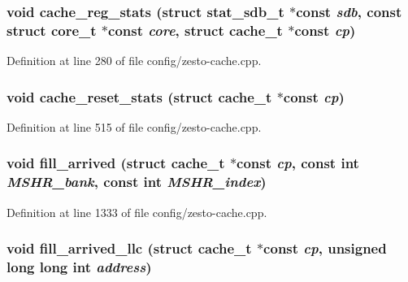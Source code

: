 \subsubsection[{cache\_\-reg\_\-stats}]{\setlength{\rightskip}{0pt plus 5cm}void cache\_\-reg\_\-stats (struct {\bf stat\_\-sdb\_\-t} $\ast$const  {\em sdb}, \/  const struct {\bf core\_\-t} $\ast$const  {\em core}, \/  struct {\bf cache\_\-t} $\ast$const  {\em cp})}\label{config_2zesto-cache_8h_80141f1bc8f06e0805162cdd6936c5d8}




Definition at line 280 of file config/zesto-cache.cpp.
\subsubsection[{cache\_\-reset\_\-stats}]{\setlength{\rightskip}{0pt plus 5cm}void cache\_\-reset\_\-stats (struct {\bf cache\_\-t} $\ast$const  {\em cp})}\label{config_2zesto-cache_8h_aff01697c94f19565dfd6d631bf4bf76}




Definition at line 515 of file config/zesto-cache.cpp.
\subsubsection[{fill\_\-arrived}]{\setlength{\rightskip}{0pt plus 5cm}void fill\_\-arrived (struct {\bf cache\_\-t} $\ast$const  {\em cp}, \/  const int {\em MSHR\_\-bank}, \/  const int {\em MSHR\_\-index})}\label{config_2zesto-cache_8h_4d5f99649851ca3db130a4a6228a1f35}




Definition at line 1333 of file config/zesto-cache.cpp.
\subsubsection[{fill\_\-arrived\_\-llc}]{\setlength{\rightskip}{0pt plus 5cm}void fill\_\-arrived\_\-llc (struct {\bf cache\_\-t} $\ast$const  {\em cp}, \/  unsigned long long int {\em address})}\label{config_2zesto-cache_8h_f1f903df28f067bfd63f3145c04a5870}




